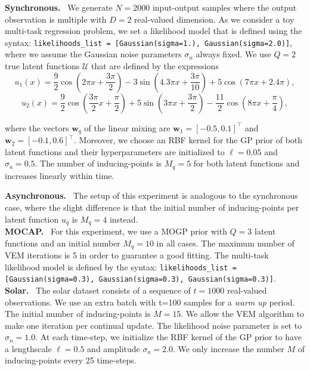 \documentclass[]{article}
\newcommand{\Ucal}{\mathcal{U}}
\begin{document}
\textbf{Synchronous.}~ We generate $N=2000$ input-output samples where the output observation is multiple with $D=2$ real-valued dimension. As we consider a toy multi-task regression problem, we set a likelihood model that is defined using the syntax: \texttt{likelihoods\_list = [Gaussian(sigma=1.), Gaussian(sigma=2.0)]}, where we assume the Gaussian noise parameters $\sigma_n$ always fixed. We use $Q=2$ true latent functions $\Ucal$ that are defined by the expressions\\

\begin{equation*}
	u_1(x) = \frac{9}{2}\cos(2\pi x + \frac{3\pi}{2}) - 3\sin(4.3\pi x + \frac{3\pi}{10}) + 5\cos(7\pi x + 2.4\pi),
\end{equation*}
\begin{equation*}
u_2(x) = \frac{9}{2}\cos(\frac{3\pi}{2} x + \frac{\pi}{2}) + 5\sin(3\pi x + \frac{3\pi}{2}) -  \frac{11}{2}\cos(8\pi x +\frac{\pi}{4}), 
\end{equation*}

where the vectors $\bm{w}_q$ of the linear mixing are $\bm{w}_1 = [-0.5, 0.1]^{\top}$ and $\bm{w}_2 = [-0.1, 0.6]^{\top}$. Moreover, we choose an RBF kernel for the GP prior of both latent functions and their hyperparameters are initialized to $\ell=0.05$ and $\sigma_a = 0.5$. The number of inducing-points is $M_q = 5$ for both latent functions and increases linearly within time.

\textbf{Asynchronous.}~ The setup of this experiment is analogous to the synchronous case, where the slight difference is that the initial number of inducing-points per latent function $u_q$ is $M_q = 4$ instead. \\

\textbf{MOCAP.}~ For this experiment, we use a MOGP prior with $Q=3$ latent functions and an initial number $M_q = 10$ in all cases. The maximum number of VEM iterations is 5 in order to guarantee a good fitting. The multi-task likelihood model is defined by the syntax: \texttt{likelihoods\_list = [Gaussian(sigma=0.3), Gaussian(sigma=0.3), Gaussian(sigma=0.3)]}.\\

\textbf{Solar.}~ The solar dataset consists of a sequence of $t=1000$ real-valued observations. We use an extra batch with t=100 samples for a \textit{warm up} period. The initial number of inducing-points is $M=15$. We allow the VEM algorithm to make one iteration per continual update. The likelihood noise parameter is set to $\sigma_n = 1.0$. At each time-step, we initialize the RBF kernel of the GP prior to have a lengthscale $\ell=0.5$ and amplitude $\sigma_a = 2.0$. We only increase the number $M$ of inducing-points every 25 time-steps.\\
\end{document}
